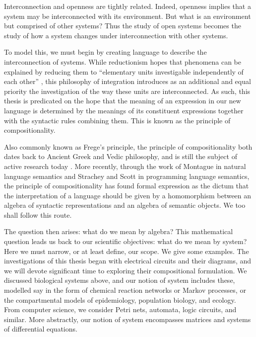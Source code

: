 Interconnection and openness are tightly related. Indeed, openness implies that
a system may be interconnected with its environment. But what is an environment
but comprised of other systems? Thus the study of open systems becomes the study
of how a system changes under interconnection with other systems.

To model this, we must begin by creating language to describe the
interconnection of systems. While reductionism hopes that phenomena can be
explained by reducing them to ``elementary units investigable independently of
each other'' \cite{Ber68}, this philosophy of integration introduces as an
additional and equal priority the investigation of the way these units are
interconnected. As such, this thesis is predicated on the hope that the meaning
of an expression in our new language is determined by the meanings of its
constituent expressions together with the syntactic rules combining them. This
is known as the principle of compositionality. 

Also commonly known as Frege's principle, the principle of compositionality both
dates back to Ancient Greek and Vedic philosophy, and is still the subject of
active research today \cite{Jan86,Sza13}. More recently, through the work of
Montague \cite{Mon70} in natural language semantics and Strachey and Scott
\cite{SS71} in programming language semantics, the principle of compositionality
has found formal expression as the dictum that the interpretation of a language
should be given by a homomorphism between an algebra of syntactic
representations and an algebra of semantic objects. We too shall follow this
route.

The question then arises: what do we mean by algebra? This mathematical question
leads us back to our scientific objectives: what do we mean by system? Here we
must narrow, or at least define, our scope. We give some examples. The
investigations of this thesis began with electrical circuits and their diagrams,
and we will devote significant time to exploring their compositional
formulation. We discussed biological systems above, and our notion of system
includes these, modelled say in the form of chemical reaction networks or Markov
processes, or the compartmental models of epidemiology, population biology, and
ecology. From computer science, we consider Petri nets, automata, logic
circuits, and similar.  More abstractly, our notion of system encompasses
matrices and systems of differential equations. 

